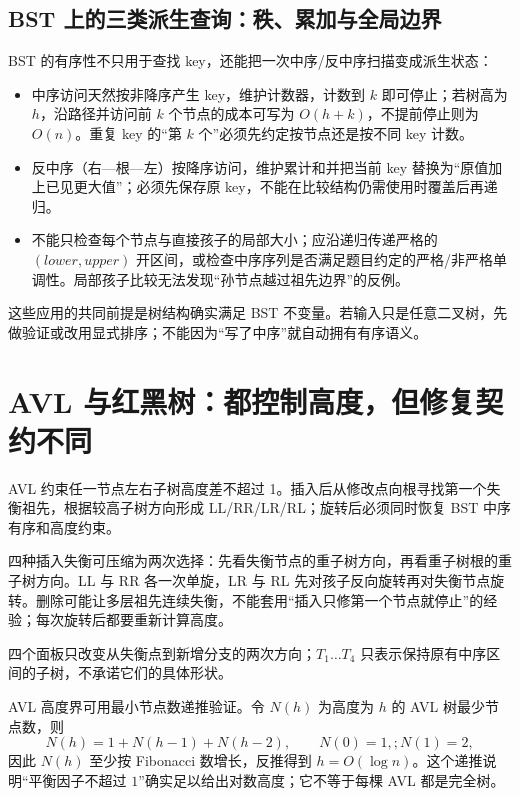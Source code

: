 \documentclass[UTF8,fontset=none,11pt,a4paper]{ctexart}
\begin{document}
\subsection{BST 上的三类派生查询：秩、累加与全局边界}
BST 的有序性不只用于查找 key，还能把一次中序/反中序扫描变成派生状态：
\begin{itemize}
\item {}中序访问天然按非降序产生 key，维护计数器，计数到 $k$ 即可停止；若树高为 $h$，沿路径并访问前 $k$ 个节点的成本可写为 $O(h+k)$，不提前停止则为 $O(n)$。重复 key 的“第 $k$ 个”必须先约定按节点还是按不同 key 计数。
\item {}反中序（右—根—左）按降序访问，维护累计和并把当前 key 替换为“原值加上已见更大值”；必须先保存原 key，不能在比较结构仍需使用时覆盖后再递归。
\item {}不能只检查每个节点与直接孩子的局部大小；应沿递归传递严格的 $(lower,upper)$ 开区间，或检查中序序列是否满足题目约定的严格/非严格单调性。局部孩子比较无法发现“孙节点越过祖先边界”的反例。
\end{itemize}
这些应用的共同前提是树结构确实满足 BST 不变量。若输入只是任意二叉树，先做验证或改用显式排序；不能因为“写了中序”就自动拥有有序语义。

\section{AVL 与红黑树：都控制高度，但修复契约不同}
AVL 约束任一节点左右子树高度差不超过 1。插入后从修改点向根寻找第一个失衡祖先，根据较高子树方向形成 LL/RR/LR/RL；旋转后必须同时恢复 BST 中序有序和高度约束。

四种插入失衡可压缩为两次选择：先看失衡节点的重子树方向，再看重子树根的重子树方向。LL 与 RR 各一次单旋，LR 与 RL 先对孩子反向旋转再对失衡节点旋转。删除可能让多层祖先连续失衡，不能套用“插入只修第一个节点就停止”的经验；每次旋转后都要重新计算高度。

\begin{center}
\resizebox{0.94\linewidth}{!}{}
\end{center}
四个面板只改变从失衡点到新增分支的两次方向；$T_1\ldots T_4$ 只表示保持原有中序区间的子树，不承诺它们的具体形状。

AVL 高度界可用最小节点数递推验证。令 $N(h)$ 为高度为 $h$ 的 AVL 树最少节点数，则
\[
N(h)=1+N(h-1)+N(h-2),\qquad N(0)=1,;N(1)=2,
\]
因此 $N(h)$ 至少按 Fibonacci 数增长，反推得到 $h=O(\log n)$。这个递推说明“平衡因子不超过 $1$”确实足以给出对数高度；它不等于每棵 AVL 都是完全树。
\end{document}
